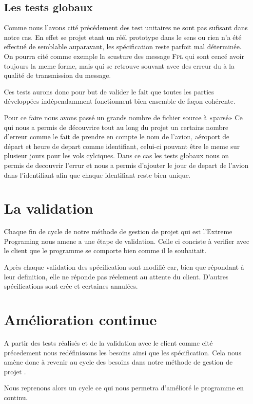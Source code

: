     \subsection{Les tests globaux}
Comme nous l'avons cité précédement des test unitaires ne sont pas sufisant dans notre cas. En effet se projet etant un réél prototype dans le sens ou rien n'a été effectué de semblable auparavant, les spécification reste parfoit mal déterminée. On pourra cité comme exemple la scusture des message \textsc{Fpl} qui sont cencé avoir toujours la meme forme, mais qui se retrouve souvant avec des erreur du à la qualité de transmission du message.

Ces tests aurons donc pour but de valider le fait que toutes les parties développées indépendamment fonctionnent bien ensemble de façon cohérente.

Pour ce faire nous avons passé un grands nombre de fichier source à «parsé» Ce qui nous a permis de découvrire tout au long du projet un certains nombre d'erreur comme le fait de prendre en compte le nom de l'avion, aéroport de départ et heure de depart comme identifiant, celui-ci pouvant être le meme sur plusieur jours pour les vols cylciques. Dans ce cas les tests globaux nous on permis de decouvrir l'errur et nous a permis d'ajouter le jour de depart de l'avion dans l'identifiant afin que chaque identifiant reste bien unique.

\section{La validation}
Chaque fin de cycle de notre méthode de gestion de projet qui est l'Extreme Programing nous amene a une étape de validation. Celle ci conciste à verifier avec le client que le programme se comporte bien comme il le souhaitait.

Après chaque validation des spécification sont modifié car, bien que répondant à leur definition, elle ne réponde pas réelement au attente du client. D'autres spécifications sont crée et certaines annulées.

\section{Amélioration continue}
A partir des tests réalisés et de la validation avec le client comme cité précedement nous redéfinissons les besoins ainsi que les spécification. Cela nous amène donc à revenir au cycle des besoins  dans notre méthode de gestion de projet .

Nous reprenons alors un cycle ce qui nous permetra d'amélioré le programme en continu.
